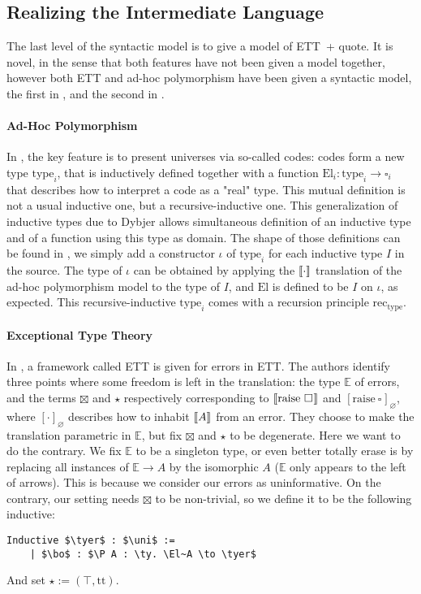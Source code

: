\documentclass{kaobook}
\renewcommand{\mathtt}{\mathrm}
\newcommand{\uni}[1][]{\square_{#1}}
\renewcommand{\P}{\operatorname{\Pi}}
\newcommand{\unit}{\top}
\DeclareMathOperator{\?}{?}
\newcommand{\rec}{\mathtt{rec}}
\newcommand{\rai}{\mathtt{raise}}
\newcommand{\quo}{\mathtt{quote}}
\newcommand{\ty}{\mathtt{type}}
\newcommand{\El}{\mathtt{El}}
\newcommand{\tyer}{\boxtimes}
\newcommand{\tyerh}{\star}
\newcommand{\bo}{\mathtt{box}}
\newcommand{\ett}{ETT}
\newcommand{\eqcic}{\ett\ + $\quo$}
\begin{document}
{\subsection{Realizing the Intermediate Language}
\label{eahp}

The last level of the syntactic model is to give a model of \eqcic. It is novel, in the sense that both features have not been given a model together, however both ETT and ad-hoc polymorphism have been given a syntactic model, the first in \cite{Pedrot2018}, and the second in \cite{Boulier2017}.

\paragraph{Ad-Hoc Polymorphism}

In \cite{Boulier2017}, the key feature is to present universes via so-called codes: codes form a new type $\ty_i$, that is inductively defined together with a function $\El_i : \ty_i \to \uni[i]$ that describes how to interpret a code as a "real" type. This mutual definition is not a usual inductive one, but a recursive-inductive one. This generalization of inductive types due to Dybjer \cite{Dybjer2000} allows simultaneous definition of an inductive type and of a function using this type as domain. The shape of those definitions can be found in \cite{Boulier2017}, we simply add a constructor $\iota$ of $\ty_i$ for each inductive type $I$ in the source. The type of $\iota$ can be obtained by applying the $\llbracket \cdot \rrbracket$ translation of the ad-hoc polymorphism model to the type of $I$, and $\El$ is defined to be $I$ on $\iota$, as expected. This recursive-inductive $\ty_i$ comes with a recursion principle $\rec_{\ty}$.

\paragraph{Exceptional Type Theory}
In \cite{Pedrot2018}, a framework called ETT is given for errors in ETT. The authors identify three points where some freedom is left in the translation: the type $\mathbb{E}$ of errors, and the terms $\tyer$ and $\tyerh$ respectively corresponding to $\lb \rai~\uni \rb$ and $[ \rai~\uni ]_\varnothing$, where $[\cdot]_\varnothing$ describes how to inhabit $\llbracket A \rrbracket$ from an error. They choose to make the translation parametric in $\mathbb{E}$, but fix $\tyer$ and $\tyerh$ to be degenerate. Here we want to do the contrary. We fix $\mathbb{E}$ to be a singleton type, or even better totally erase is by replacing all instances of $\mathbb{E} \to A$ by the isomorphic $A$ ($\mathbb{E}$ only appears to the left of arrows). This is because we consider our errors as uninformative. On the contrary, our setting needs $\tyer$ to be non-trivial, so we define it to be the following inductive:
\begin{lstlisting}
Inductive $\tyer$ : $\uni$ :=
	| $\bo$ : $\P A : \ty. \El~A \to \tyer$
\end{lstlisting}
And set $\tyerh := (\unit, \mathtt{tt})$.

}
\end{document}

